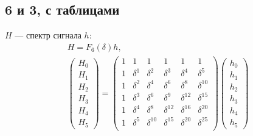 \subsection{6 и 3, с таблицами}

$H$ --- спектр сигнала $h$:
\begin{gather*}
    H = F_6(\delta) h , \\
    \begin{pmatrix}
        H_0 \\
        H_1 \\
        H_2 \\
        H_3 \\
        H_4 \\
        H_5
    \end{pmatrix}
    = \begin{pmatrix}
        1 & 1        & 1           & 1           & 1           & 1           \\
        1 & \delta^1 & \delta^2    & \delta^3    & \delta^4    & \delta^5    \\
        1 & \delta^2 & \delta^4    & \delta^6    & \delta^8    & \delta^{10} \\
        1 & \delta^3 & \delta^6    & \delta^9    & \delta^{12} & \delta^{15} \\
        1 & \delta^4 & \delta^8    & \delta^{12} & \delta^{16} & \delta^{20} \\
        1 & \delta^5 & \delta^{10} & \delta^{15} & \delta^{20} & \delta^{25} \\
    \end{pmatrix}
    \begin{pmatrix}
        h_0 \\
        h_1 \\
        h_2 \\
        h_3 \\
        h_4 \\
        h_5
    \end{pmatrix}
\end{gather*}


